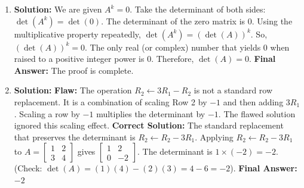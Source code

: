 \documentclass[11pt]{article}
\begin{document}
\begin{enumerate}
    \item \textbf{Solution:} We are given $A^k = 0$. Take the determinant of both sides:
    $\det(A^k) = \det(0)$.
    The determinant of the zero matrix is $0$.
    Using the multiplicative property repeatedly, $\det(A^k) = (\det(A))^k$.
    So, $(\det(A))^k = 0$.
    The only real (or complex) number that yields $0$ when raised to a positive integer power is $0$. Therefore, $\det(A) = 0$.
    \textbf{Final Answer:} The proof is complete.

    \item \textbf{Solution:} \textbf{Flaw:} The operation $R_2 \leftarrow 3R_1 - R_2$ is not a standard row replacement. It is a combination of scaling Row 2 by $-1$ and then adding $3R_1$. Scaling a row by $-1$ multiplies the determinant by $-1$. The flawed solution ignored this scaling effect.
    \textbf{Correct Solution:} The standard replacement that preserves the determinant is $R_2 \leftarrow R_2 - 3R_1$.
    Applying $R_2 \leftarrow R_2 - 3R_1$ to $A = \begin{bmatrix} 1 & 2 \\ 3 & 4 \end{bmatrix}$ gives $\begin{bmatrix} 1 & 2 \\ 0 & -2 \end{bmatrix}$.
    The determinant is $1 \times (-2) = -2$. (Check: $\det(A) = (1)(4) - (2)(3) = 4 - 6 = -2$).
    \textbf{Final Answer:} $-2$

\end{enumerate}

\newpage
\end{document}
